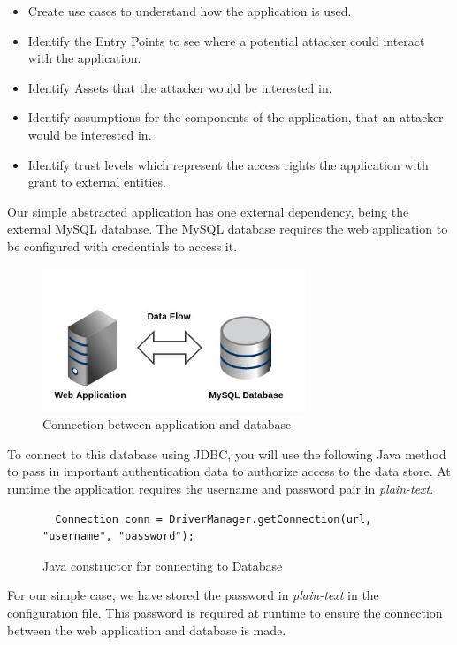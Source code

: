 \documentclass[11pt, a4paper, twoside, notitlepage]{article}
\begin{document}
\begin{itemize}
  \item Create use cases to understand how the application is used.
  \item Identify the Entry Points to see where a potential attacker could interact with the application.
  \item Identify Assets that the attacker would be interested in.
  \item Identify assumptions for the components of the application, that an attacker would be interested in.
  \item Identify trust levels which represent the access rights the application with grant to external entities. 
\end{itemize}

Our simple abstracted application has one external dependency, being the external MySQL database.  The MySQL database requires the web application to be configured with credentials to access it. 

\begin{figure}[h!]
    \centering
    \includegraphics[width=0.7\textwidth]{external-overview.jpg}
    \caption{Connection between application and database}
\end{figure}

To connect to this database using JDBC, you will use the following Java method to pass in important authentication data to authorize access to the data store. At runtime the application requires the username and password pair in \emph{plain-text}. 


\begin{figure}[h!]
\begin{lstlisting}
  Connection conn = DriverManager.getConnection(url, "username", "password");
\end{lstlisting} 
\caption{Java constructor for connecting to Database}
\end{figure}

For our simple case, we have stored the password in \emph{plain-text} in the configuration file. This password is required at runtime to ensure the connection between the web application and database is made. 
\end{document}
